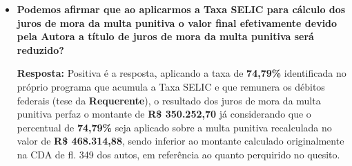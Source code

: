 \begin{addmargin}[6cm]{}
\begin{itemize}
\item \textbf{Podemos afirmar que ao aplicarmos a Taxa SELIC para cálculo dos juros de mora da multa punitiva o valor final efetivamente devido pela Autora a título de juros de mora da multa punitiva será reduzido?}

\textbf{Resposta:} Positiva é a resposta, aplicando a taxa de \textbf{74,79\%} identificada no próprio programa que acumula a Taxa SELIC e que remunera os débitos federais (tese da \textbf{Requerente}), o resultado dos juros de mora da multa punitiva perfaz o montante de \textbf{R\$ 350.252,70} já considerando que o percentual de \textbf{74,79\%} seja aplicado sobre a multa punitiva recalculada no valor de \textbf{R\$ 468.314,88}, sendo inferior ao montante calculado originalmente na CDA de fl. 349 dos autos, em referência ao quanto perquirido no quesito.
\end{itemize}
\end{addmargin}
